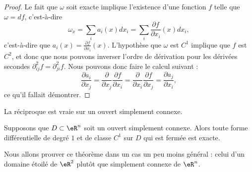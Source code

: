 \begin{proof}
	Le fait que $\omega$ soit exacte implique l'existence d'une fonction $f$ telle que $\omega=df$, c'est-à-dire
	\begin{equation}
		\omega_x=\sum_i a_i(x)dx_i=\sum_i\frac{ \partial f }{ \partial x_i }(x)dx_i,
	\end{equation}
	c'est-à-dire que $a_i(x)=\frac{ \partial f }{ \partial x_i }(x)$. L'hypothèse que $\omega$ est $C^1$ implique que $f$ est $C^2$, et donc que nous pouvons inverser l'ordre de dérivation pour les dérivées secondes $\partial^2_{ij}f=\partial^2_{ji}f$. Nous pouvons donc faire le calcul suivant :
	\begin{equation}
		\frac{ \partial a_i }{ \partial x_j }=\frac{ \partial  }{ \partial x_j }\frac{ \partial f }{ \partial x_i }=\frac{ \partial  }{ \partial x_i }\frac{ \partial f }{ \partial x_j }=\frac{ \partial a_j }{ \partial x_i },
	\end{equation}
	ce qu'il fallait démontrer.
\end{proof}

La réciproque est vraie sur un ouvert simplement connexe.
\begin{theorem}        \label{ThoFermeExactFormRappel}
	Supposons que $D\subset\eR^n$ soit un ouvert simplement connexe. Alors toute forme différentielle de degré $1$ et de classe $C^1$ sur $D$ qui est fermée est exacte.
\end{theorem}

Nous allons prouver ce théorème dans un cas un peu moins général : celui d'un domaine étoilé de \( \eR^2\) plutôt que simplement connexe de \( \eR^n\).

